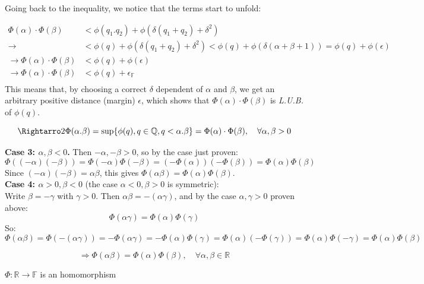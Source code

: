\begin{bookproof}
Going back to the inequality, we notice that the terms start to unfold:

\begin{align*}
\Phi(\alpha) \cdot \Phi(\beta) &< \phi(q_1.q_2) + \phi(\delta(q_1 + q_2) + \delta ^2) \\
\rightarrow &< \phi(q) + \phi(\delta (q_1 + q_2) + \delta ^2) < \phi(q) + \phi(\delta (\alpha + \beta + 1) ) = \phi(q) + \phi(\epsilon) \\ 
\rightarrow \Phi(\alpha) \cdot \Phi(\beta) &< \phi(q) + \phi(\epsilon) \\
\rightarrow \Phi(\alpha) \cdot \Phi(\beta) &< \phi(q) + \epsilon _\mathbb{F} \\
\end{align*} 
This means that, by choosing a correct $\delta$ dependent of $\alpha$ and $\beta$, we get an arbitrary positive distance (margin) $\epsilon$, which shows that $\Phi(\alpha) \cdot \Phi(\beta)$ is \textit{L.U.B.} of $\phi(q)$.

$$\Rightarro2 \Phi(\alpha . \beta) = \sup\{\phi(q),q \in \mathbb{Q}, q < \alpha.\beta\} = \Phi(\alpha) \cdot \Phi(\beta), \quad \forall \alpha, \beta > 0$$

\textbf{Case 3: $\alpha, \beta < 0$.} Then $-\alpha, -\beta > 0$, so by the case just proven:
$$\Phi((-\alpha)(-\beta)) = \Phi(-\alpha)\Phi(-\beta) = (-\Phi(\alpha))(-\Phi(\beta)) = \Phi(\alpha)\Phi(\beta)$$
Since $(-\alpha)(-\beta) = \alpha\beta$, this gives $\Phi(\alpha\beta) = \Phi(\alpha)\Phi(\beta)$.\\

\textbf{Case 4: $\alpha > 0, \beta < 0$} (the case $\alpha < 0, \beta > 0$ is symmetric):\\

Write $\beta = -\gamma$ with $\gamma > 0$. Then $\alpha\beta = -(\alpha\gamma)$, and by the case $\alpha, \gamma > 0$ proven above:
$$\Phi(\alpha\gamma) = \Phi(\alpha)\Phi(\gamma)$$
So:
$$\Phi(\alpha\beta) = \Phi(-(\alpha\gamma)) = -\Phi(\alpha\gamma) = -\Phi(\alpha)\Phi(\gamma) = \Phi(\alpha)(-\Phi(\gamma)) = \Phi(\alpha)\Phi(-\gamma) = \Phi(\alpha)\Phi(\beta)$$

$$\Rightarrow \Phi(\alpha\beta) = \Phi(\alpha)\Phi(\beta), \quad \forall \alpha, \beta \in \mathbb{R}$$
\end{bookproof}

\begin{lemma}\label{le:Phi-homomorphism}
$\Phi: \mathbb{R} \rightarrow \mathbb{F}$ is an homomorphism
\end{lemma}

